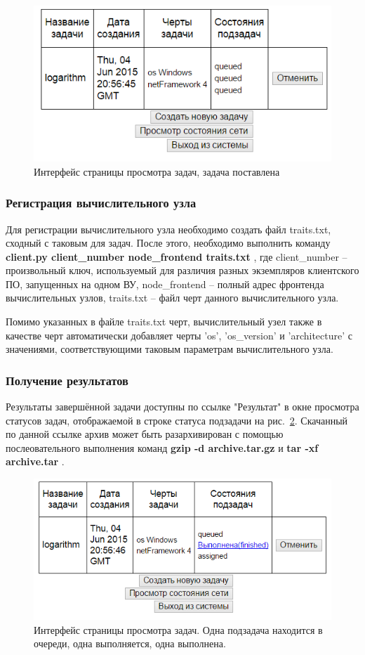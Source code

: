 \documentclass[a4paper,12pt]{report}
\numberwithin{equation}{section}
\begin{document}
  \begin{figure}
    \centering
    \includegraphics[width=.49\linewidth]{img/interface/tasks-created}
    \caption{Интерфейс страницы просмотра задач, задача поставлена}
    \label{fig:interface-tasks-created}
  \end{figure}  
  
  \subsubsection{Регистрация вычислительного узла}
  Для регистрации вычислительного узла необходимо создать файл traits.txt, сходный с таковым для задач. 
  После этого, необходимо выполнить команду  
  \textbf{ client.py client\_number node\_frontend traits.txt }
  , где client\_number -- произвольный ключ, используемый для различия разных экземпляров клиентского ПО, запущенных на одном ВУ,
  node\_frontend -- полный адрес фронтенда вычислительных узлов,
  traits.txt -- файл черт данного вычислительного узла.
  
  Помимо указанных в файле traits.txt черт, вычислительный узел также в качестве черт автоматически добавляет 
  черты 'os', 'os\_version' и 'architecture' с значениями, соответствующими таковым параметрам вычислительного узла.
  
  \subsubsection{Получение результатов}
  Результаты завершённой задачи доступны по ссылке "Результат" в окне просмотра статусов задач, отображаемой в строке статуса подзадачи на рис.~\ref{fig:interface-tasks-partial}.
  Скачанный по данной ссылке архив может быть разархивирован с помощью послеовательного выполнения команд
  \textbf{ gzip -d archive.tar.gz } и 
  \textbf{ tar -xf archive.tar }.     
  
  \begin{figure}
    \centering
    \includegraphics[width=.49\linewidth]{img/interface/tasks-partial}
    \caption{Интерфейс страницы просмотра задач. Одна подзадача находится в очереди, одна выполняется, одна выполнена.}
    \label{fig:interface-tasks-partial}
  \end{figure}  
  
\end{document}
